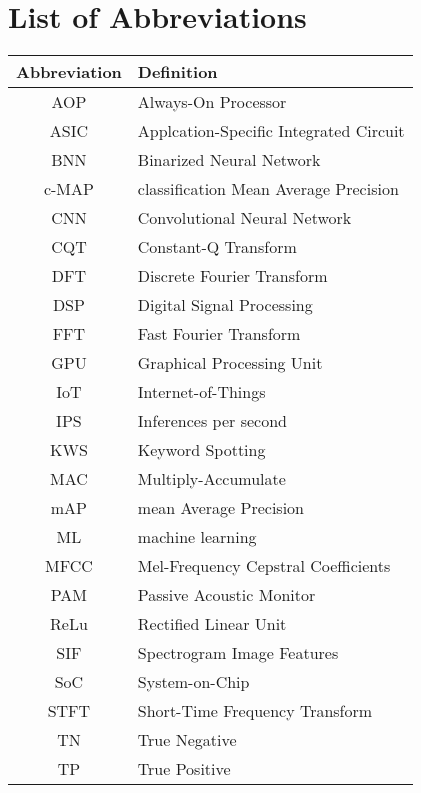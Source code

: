 \chapter*{List of Abbreviations}
\thispagestyle{empty}

\vspace{0.5cm}

\begin{longtable}{|c|l|} 
 \hline
  \textbf{Abbreviation} & \textbf{Definition} \\ \hline
    AOP & Always-On Processor \\ \hline
    ASIC & Applcation-Specific Integrated Circuit \\ \hline
    BNN & Binarized Neural Network \\ \hline
    c-MAP & classification Mean Average Precision \\ \hline
    CNN & Convolutional Neural Network \\ \hline
    CQT & Constant-Q Transform \\ \hline
    DFT & Discrete Fourier Transform \\ \hline
    DSP & Digital Signal Processing \\ \hline
    FFT & Fast Fourier Transform \\ \hline
    GPU & Graphical Processing Unit \\ \hline
    IoT & Internet-of-Things \\ \hline
    IPS & Inferences per second \\ \hline
    KWS & Keyword Spotting \\ \hline
    MAC & Multiply-Accumulate \\ \hline
    mAP & mean Average Precision \\ \hline
    ML & machine learning \\ \hline
    MFCC & Mel-Frequency Cepstral Coefficients \\ \hline
    PAM & Passive Acoustic Monitor \\ \hline
    ReLu & Rectified Linear Unit \\ \hline
    SIF & Spectrogram Image Features \\ \hline
    SoC & System-on-Chip \\ \hline
    STFT & Short-Time Frequency Transform \\ \hline
    TN & True Negative \\ \hline
    TP & True Positive \\ \hline
\end{longtable}